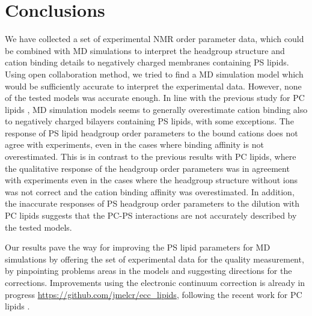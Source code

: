 \documentclass[aps,prl,superscriptaddress,twocolumn]{revtex4}
\begin{document}
\section{Conclusions}
We have collected a set of experimental NMR order parameter data,
which could be combined with MD simulations to interpret the
headgroup structure and cation binding details to negatively charged
membranes containing PS lipids. Using open collaboration method, we
tried to find a MD simulation model which would be sufficiently accurate
to interpret the experimental data. However, none of the tested models
was accurate enough. In line with the previous study for PC lipids \cite{catte16},
MD simulation models seems to generally overestimate cation binding also
to negatively charged bilayers containing PS lipids, with some exceptions.
The response of PS lipid headgroup order parameters to the bound cations
does not agree with experiments, even in the cases where binding affinity is
not overestimated. This is in contrast to the previous results with PC lipids,
where the qualitative response of the headgroup order parameters was in agreement
with experiments even in the cases where the headgroup structure without ions was not
correct and the cation binding affinity was overestimated. In addition, the inaccurate
responses of PS headgroup order parameters to the dilution with PC lipids suggests
that the PC-PS interactions are not accurately described by the tested models.

Our results pave the way for improving the PS lipid parameters for MD simulations
by offering the set of experimental data for the quality measurement, by
pinpointing problems areas in the models and suggesting directions for the corrections.
Improvements using the electronic continuum correction is already in progress \url{https://github.com/jmelcr/ecc_lipids},
following the recent work for PC lipids \cite{melcr18}.

%

\begin{acknowledgments}
\end{acknowledgments}

\newpage





\listoftodos
\end{document}
